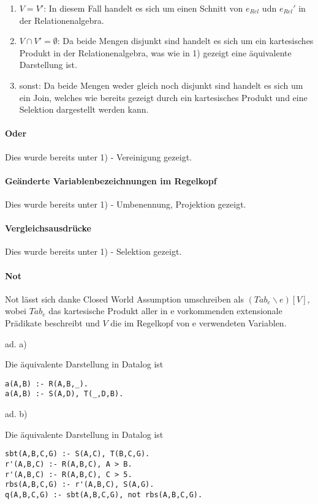 \documentclass[12pt,a4paper]{amsart}
\begin{document}
\begin{aufgabe1}
\begin{enumerate}
\item $V = V'$: In diesem Fall handelt es sich um einen Schnitt von $e_{Rel}$ udn $e_{Rel}'$ in der Relationenalgebra.
\item $V \cap V' = \emptyset$: Da beide Mengen disjunkt sind handelt es sich um ein kartesisches Produkt in der Relationenalgebra, was wie in 1) gezeigt eine äquivalente Darstellung ist.
\item sonst: Da beide Mengen weder gleich noch disjunkt sind handelt es sich um ein Join, welches wie bereits gezeigt durch ein kartesisches Produkt und eine Selektion dargestellt werden kann.
\end{enumerate}

\paragraph{\textbf{Oder}}
Dies wurde bereits unter 1) - Vereinigung gezeigt.

\paragraph{\textbf{Geänderte Variablenbezeichnungen im Regelkopf}}
Dies wurde bereits unter 1) - Umbenennung, Projektion gezeigt.

\paragraph{\textbf{Vergleichsausdrücke}}
Dies wurde bereits unter 1) - Selektion gezeigt. 

\paragraph{\textbf{Not}}
Not lässt sich danke Closed World Assumption umschreiben als $(Tab_e \backslash e)[V]$, wobei $Tab_e$ das kartesische Produkt aller in e vorkommenden extensionale Prädikate beschreibt und $V$ die im Regelkopf von e verwendeten Variablen.

\end{aufgabe1}


\begin{aufgabe1}
ad. a)

Die äquivalente Darstellung in Datalog ist

\begin{lstlisting}
a(A,B) :- R(A,B,_).
a(A,B) :- S(A,D), T(_,D,B).
\end{lstlisting}

ad. b)

Die äquivalente Darstellung in Datalog ist


\begin{lstlisting}
sbt(A,B,C,G) :- S(A,C), T(B,C,G).
r'(A,B,C) :- R(A,B,C), A > B.
r'(A,B,C) :- R(A,B,C), C > 5.
rbs(A,B,C,G) :- r'(A,B,C), S(A,G).
q(A,B,C,G) :- sbt(A,B,C,G), not rbs(A,B,C,G).
\end{lstlisting}
\end{aufgabe1}
\end{document}
